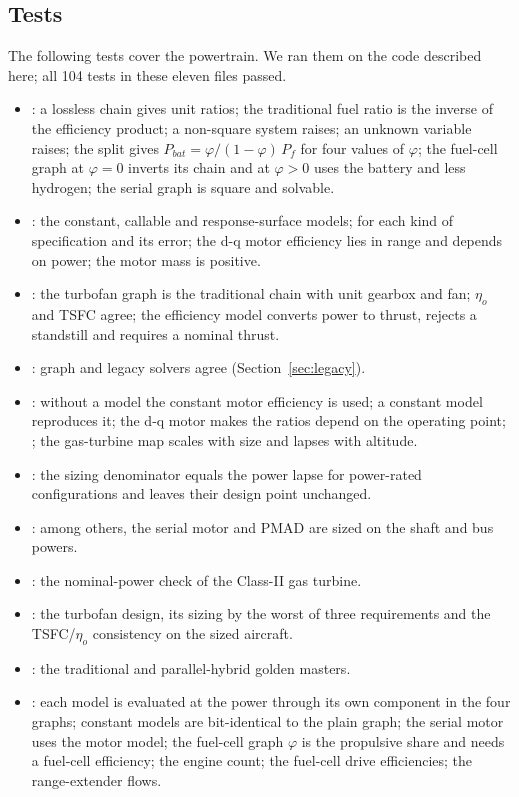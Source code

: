 \documentclass[a4paper,11pt]{article}
\begin{document}
\subsection{Tests}
The following tests cover the powertrain. We ran them on the code described here; all 104
tests in these eleven files passed.
\begin{itemize}
\item {}: a lossless chain gives unit ratios; the
  traditional fuel ratio is the inverse of the efficiency product; a non-square system raises;
  an unknown variable raises; the split gives $P_{bat} = \varphi/(1-\varphi)\,P_f$ for four
  values of $\varphi$; the fuel-cell graph at $\varphi = 0$ inverts its chain and at
  $\varphi > 0$ uses the battery and less hydrogen; the serial graph is square and solvable.
\item {}: the constant, callable and response-surface models;
   for each kind of specification and its error; the d-q motor
  efficiency lies in range and depends on power; the motor mass is positive.
\item {}: the turbofan graph is the traditional
  chain with unit gearbox and fan; $\eta_o$ and TSFC agree; the efficiency model converts
  power to thrust, rejects a standstill and requires a nominal thrust.
\item {}: graph and legacy solvers agree
  (Section~\ref{sec:legacy}).
\item {}: without a model the constant motor
  efficiency is used; a constant model reproduces it; the d-q motor makes the ratios depend on
  the operating point; ; the gas-turbine map scales with size
  and lapses with altitude.
\item {}: the sizing denominator equals the
  power lapse for power-rated configurations and leaves their design point unchanged.
\item {}: among others, the serial motor and
  PMAD are sized on the shaft and bus powers.
\item {}: the nominal-power check of the Class-II
  gas turbine.
\item {}: the turbofan design, its sizing by the worst of
  three requirements and the TSFC/$\eta_o$ consistency on the sized aircraft.
\item {}: the traditional and parallel-hybrid
  golden masters.
\item {}: each model is evaluated at
  the power through its own component in the four graphs; constant models are bit-identical
  to the plain graph; the serial motor uses the motor model; the fuel-cell graph $\varphi$ is
  the propulsive share and needs a fuel-cell efficiency; the engine count; the fuel-cell drive
  efficiencies; the range-extender flows.
\end{itemize}
\end{document}
